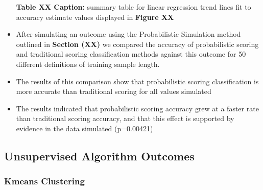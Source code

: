 \documentclass[12pt,]{article}
\begin{document}
\begin{itemize}
  \textbf{Table XX Caption:} summary table for linear regression trend
  lines fit to accuracy estimate values displayed in \textbf{Figure XX}
\item
  After simulating an outcome using the Probabilistic Simulation method
  outlined in \textbf{Section (XX)} we compared the accuracy of
  probabilistic scoring and traditional scoring classification methods
  against this outcome for 50 different definitions of training sample
  length.
\item
  The results of this comparison show that probabilistic scoring
  classification is more accurate than traditional scoring for all
  values simulated
\item
  The results indicated that probabilistic scoring accuracy grew at a
  faster rate than traditional scoring accuracy, and that this effect is
  supported by evidence in the data simulated (p=0.00421)
\end{itemize}

\hypertarget{unsupervised-algorithm-outcomes}{%
\subsection{Unsupervised Algorithm
Outcomes}\label{unsupervised-algorithm-outcomes}}

\hypertarget{kmeans-clustering}{%
\subsubsection{Kmeans Clustering}\label{kmeans-clustering}}
\end{document}
